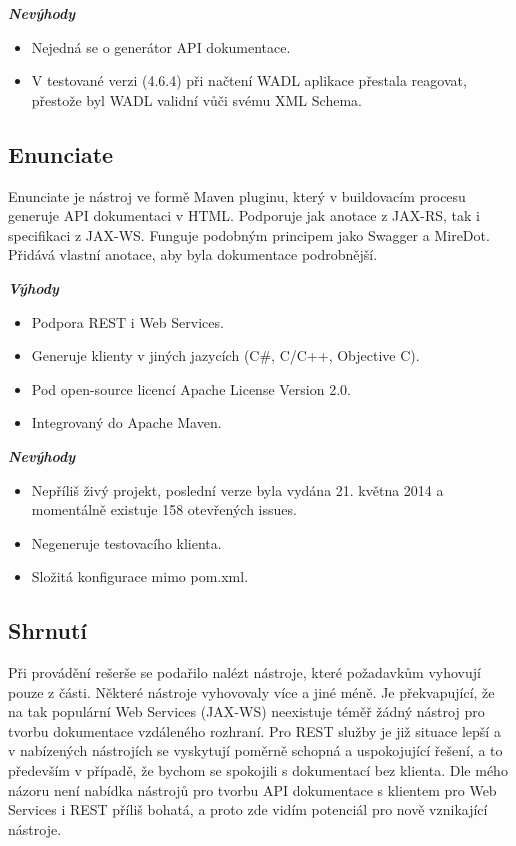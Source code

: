 \documentclass[11pt,twoside,a4paper]{book}
\begin{document}
\begin{itemize}
\textbf{\textit{Nevýhody}}

\begin{itemize}
  \item Nejedná se o generátor API dokumentace.
  \item V testované verzi (4.6.4) při načtení WADL aplikace přestala reagovat, přestože byl
WADL validní vůči svému XML Schema.
\end{itemize}

\subsection{Enunciate}

Enunciate je nástroj ve formě Maven pluginu, který v buildovacím procesu generuje API
dokumentaci v HTML. Podporuje jak anotace z JAX-RS, tak i specifikaci z JAX-WS.
Funguje podobným principem jako Swagger a MireDot. Přidává vlastní anotace, aby byla
dokumentace podrobnější.

\textbf{\textit{Výhody}}

\begin{itemize}
  \item Podpora REST i Web Services.
  \item Generuje klienty v jiných jazycích (C#, C/C++, Objective C).
  \item Pod open-source licencí Apache License Version 2.0.
  \item Integrovaný do Apache Maven.
\end{itemize}

\textbf{\textit{Nevýhody}}

\begin{itemize}
  \item Nepříliš živý projekt, poslední verze byla vydána 21. května 2014 a momentálně
existuje 158 otevřených issues.
  \item Negeneruje testovacího klienta.
  \item Složitá konfigurace mimo pom.xml.
\end{itemize}

\subsection{Shrnutí}

Při provádění rešerše se podařilo nalézt nástroje, které požadavkům vyhovují pouze z části.
Některé nástroje vyhovovaly více a jiné méně. Je překvapující, že na tak populární Web
Services (JAX-WS) neexistuje téměř žádný nástroj pro tvorbu dokumentace vzdáleného
rozhraní. Pro REST služby je již situace lepší a v nabízených nástrojích se vyskytují poměrně
schopná a uspokojující řešení, a to především v případě, že bychom se spokojili s
dokumentací bez klienta. Dle mého názoru není nabídka nástrojů pro tvorbu API
dokumentace s klientem pro Web Services i REST příliš bohatá, a proto zde vidím potenciál
pro nově vznikající nástroje.


\end{itemize}
\end{document}
